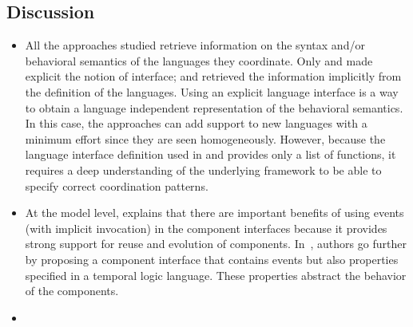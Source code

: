 	\subsection{Discussion}
	\begin{itemize}
	
	    	\item All the approaches studied retrieve information on the syntax and/or behavioral semantics of the languages they coordinate. Only \cite{ptolemybib} and \cite{modhelxbib} made explicit the notion of interface; \cite{MarcoModels2014} and \cite{mascotbib} retrieved the information implicitly from the definition of the languages. 
	    	Using an explicit language interface is a way to obtain a language independent representation of the behavioral semantics. In this case, the approaches can add support to new languages with a minimum effort since they are seen homogeneously. However, because the language interface definition used in \cite{ptolemybib} and \cite{modhelxbib} provides only a list of functions, it requires a deep understanding of the underlying framework to be able to specify correct coordination patterns. 
	    	
	    	\item At the model level, \cite{garlansoftarchbib} explains that there are important benefits of using events (with implicit invocation) in the component interfaces because it provides strong support for reuse and evolution of components. 
	    	In~\cite{coordinainterfacebib}, authors go further by proposing a component interface that contains events but also properties specified in a temporal logic language. These properties abstract the behavior of the components.
	    	
	    	\item {}
	    	

\end{itemize}
